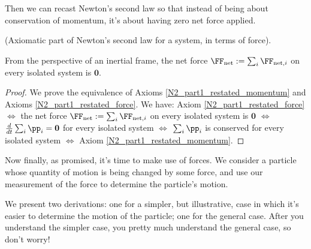 \documentclass{article}
\begin{document}
Then we can recast Newton's second law so that instead of being about conservation of momentum, it's about having zero net force applied.

\begin{axiom}
    \label{N2_part1_restated_force}
    
    (Axiomatic part of Newton's second law for a system, in terms of force).
    
    From the perspective of an inertial frame, the net force $\FF_{\text{net}} := \sum_i \FF_{\text{net}, i}$ on every isolated system is $\mathbf{0}$.
\end{axiom}

\begin{proof}
    We prove the equivalence of Axioms \ref{N2_part1_restated_momentum} and Axioms \ref{N2_part1_restated_force}. We have: Axiom \ref{N2_part1_restated_force} $\iff$ the net force $\FF_{\text{net}} := \sum_i \FF_{\text{net}, i}$ on every isolated system is $\mathbf{0}$ $\iff$ $\frac{d}{dt} \sum_i \pp_i = \mathbf{0}$ for every isolated system $\iff$ $\sum_i \pp_i$ is conserved for every isolated system $\iff$ Axiom \ref{N2_part1_restated_momentum}. 
\end{proof}

Now finally, as promised, it's time to make use of forces. We consider a particle whose quantity of motion is being changed by some force, and use our measurement of the force to determine the particle's motion.

We present two derivations: one for a simpler, but illustrative, case in which it's easier to determine the motion of the particle; one for the general case. After you understand the simpler case, you pretty much understand the general case, so don't worry!
\end{document}

